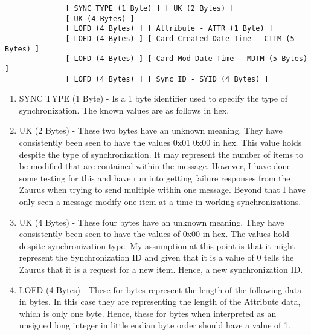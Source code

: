             \begin{verbatim}
              [ SYNC TYPE (1 Byte) ] [ UK (2 Bytes) ]
              [ UK (4 Bytes) ]
              [ LOFD (4 Bytes) ] [ Attribute - ATTR (1 Byte) ]
              [ LOFD (4 Bytes) ] [ Card Created Date Time - CTTM (5 Bytes) ]
              [ LOFD (4 Bytes) ] [ Card Mod Date Time - MDTM (5 Bytes) ]
              [ LOFD (4 Bytes) ] [ Sync ID - SYID (4 Bytes) ]
            \end{verbatim}

            \begin{enumerate}
            \item SYNC TYPE (1 Byte) - Is a 1 byte identifier used to specify
              the type of synchronization. The known values are as 
              follows in hex.

              \synctypes

            \item UK (2 Bytes) - These two bytes have an unknown meaning. They
              have consistently been seen to have the values 0x01 0x00 in
              hex. This value holds despite the type of synchronization. It
              may represent the number of items to be modified that are
              contained within the message. However, I have done some testing
              for this and have run into getting failure responses from the
              Zaurus when trying to send multiple within one message. Beyond
              that I have only seen a message modify one item at a time in
              working synchronizations.

            \item UK (4 Bytes) - These four bytes have an unknown
              meaning. They have consistently been seen to have the values of
              0x00 in hex. The values hold despite synchronization type. My
              assumption at this point is that it might represent the
              Synchronization ID and given that it is a value of 0 tells the
              Zaurus that it is a request for a new item. Hence, a new
              synchronization ID.

            \item LOFD (4 Bytes) - These for bytes represent the length of the
              following data in bytes. In this case they are representing the
              length of the Attribute data, which is only one byte. Hence,
              these for bytes when interpreted as an unsigned long integer in
              little endian byte order should have a value of 1.


\end{enumerate}
